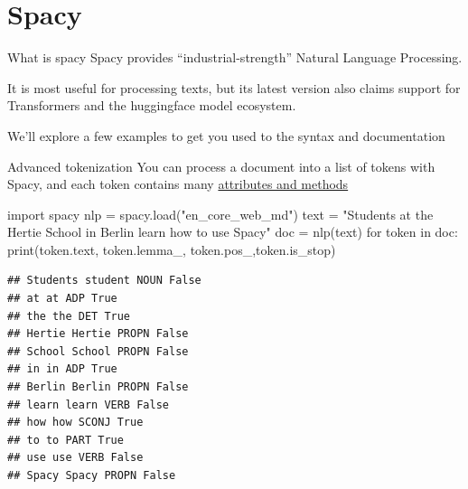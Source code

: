 \documentclass[
  10pt,
  ignorenonframetext,
  aspectratio=169]{beamer}
\newenvironment{Shaded}{\begin{snugshade}}{\end{snugshade}}
\newcommand{\BuiltInTok}[1]{\textcolor[rgb]{0.80,0.80,0.80}{#1}}
\newcommand{\ControlFlowTok}[1]{\textcolor[rgb]{0.94,0.87,0.69}{#1}}
\newcommand{\ImportTok}[1]{\textcolor[rgb]{0.80,0.80,0.80}{#1}}
\newcommand{\KeywordTok}[1]{\textcolor[rgb]{0.94,0.87,0.69}{#1}}
\newcommand{\NormalTok}[1]{\textcolor[rgb]{0.80,0.80,0.80}{#1}}
\newcommand{\OperatorTok}[1]{\textcolor[rgb]{0.94,0.94,0.82}{#1}}
\newcommand{\StringTok}[1]{\textcolor[rgb]{0.80,0.58,0.58}{#1}}
\begin{document}
\hypertarget{spacy}{%
\section{Spacy}\label{spacy}}

\begin{frame}{What is spacy}
\protect\hypertarget{what-is-spacy}{}
Spacy provides ``industrial-strength'' Natural Language Processing.

It is most useful for processing texts, but its latest version also
claims support for Transformers and the huggingface model ecosystem.

We'll explore a few examples to get you used to the syntax and
documentation
\end{frame}

\begin{frame}[fragile]{Advanced tokenization}
\protect\hypertarget{advanced-tokenization}{}
You can process a document into a list of tokens with Spacy, and each
token contains many \href{https://spacy.io/api/token}{attributes and
methods}

\medskip
\scriptsize

\begin{Shaded}
\begin{Highlighting}[]
\ImportTok{import}\NormalTok{ spacy}
\NormalTok{nlp }\OperatorTok{=}\NormalTok{ spacy.load(}\StringTok{"en\_core\_web\_md"}\NormalTok{)}
\NormalTok{text }\OperatorTok{=} \StringTok{"Students at the Hertie School in Berlin learn how to use Spacy"}
\NormalTok{doc }\OperatorTok{=}\NormalTok{ nlp(text)}
\ControlFlowTok{for}\NormalTok{ token }\KeywordTok{in}\NormalTok{ doc:}
    \BuiltInTok{print}\NormalTok{(token.text, token.lemma\_, token.pos\_,token.is\_stop)}
\end{Highlighting}
\end{Shaded}

\begin{verbatim}
## Students student NOUN False
## at at ADP True
## the the DET True
## Hertie Hertie PROPN False
## School School PROPN False
## in in ADP True
## Berlin Berlin PROPN False
## learn learn VERB False
## how how SCONJ True
## to to PART True
## use use VERB False
## Spacy Spacy PROPN False
\end{verbatim}
\end{frame}
\end{document}
